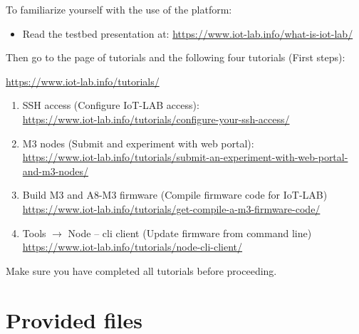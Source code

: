 \documentclass{article}
\begin{document}
To familiarize yourself with the use of the platform:
\begin{itemize}
\item Read the testbed presentation at: \url{https://www.iot-lab.info/what-is-iot-lab/}
\end{itemize}


Then go to the page of tutorials and the following four tutorials (First steps):
\begin{center} \url{https://www.iot-lab.info/tutorials/} \end{center}
\begin{enumerate}
   \item SSH access (Configure IoT-LAB access): \\
   \url{https://www.iot-lab.info/tutorials/configure-your-ssh-access/}
   \item M3 nodes (Submit and experiment with web portal): \\
   \url{https://www.iot-lab.info/tutorials/submit-an-experiment-with-web-portal-and-m3-nodes/}
   \item Build M3 and A8-M3 firmware (Compile firmware code for IoT-LAB)\\
   \url{https://www.iot-lab.info/tutorials/get-compile-a-m3-firmware-code/}
   \item Tools $\to$ Node -- cli client (Update firmware from command line) \\
   \url{https://www.iot-lab.info/tutorials/node-cli-client/}
\end{enumerate}

Make sure you have completed all tutorials before proceeding.




\section{Provided files}
\end{document}
